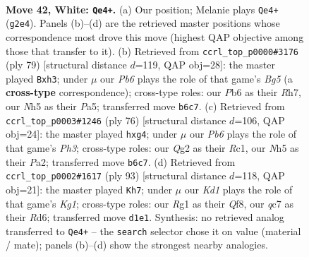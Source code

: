 \documentclass[11pt]{article}
\begin{document}
\clearpage

\begin{figure}[p]\centering
\begin{subfigure}{0.46\textwidth}\centering
\resizebox{\linewidth}{!}{%
\newchessgame
\chessboard[
  setfen={2b1k3/p1qn1r1p/1P3b1B/5P1N/1p1p4/8/p3P1Q1/1N1K2R1 w - - 0 42},
  showmover=false,
  pgfstyle=straightmove, color=movearrow, markmove={g2-e4}
]}
\caption{}
\end{subfigure}\hfill
\begin{subfigure}{0.46\textwidth}\centering
\resizebox{\linewidth}{!}{%
\newchessgame
\chessboard[
  setfen={5rk1/7r/1p6/p1nPp3/2P1P1b1/2R2N1Q/8/1R3BK1 b - - 0 40},
  showmover=false,
  pgfstyle=straightmove, color=movearrow, markmove={g4-h3}
]}
\caption{}
\end{subfigure}
\\[4pt]
\begin{subfigure}{0.46\textwidth}\centering
\resizebox{\linewidth}{!}{%
\newchessgame
\chessboard[
  setfen={7k/r5bp/8/p2N4/1p1n2q1/1P5P/P5N1/2R4K w - - 0 39},
  showmover=false,
  pgfstyle=straightmove, color=movearrow, markmove={h3-g4}
]}
\caption{}
\end{subfigure}\hfill
\begin{subfigure}{0.46\textwidth}\centering
\resizebox{\linewidth}{!}{%
\newchessgame
\chessboard[
  setfen={5qk1/8/p2rb1p1/3NQ1pn/2B1P3/8/1PR5/1K6 b - - 6 47},
  showmover=false,
  pgfstyle=straightmove, color=movearrow, markmove={g8-h7}
]}
\caption{}
\end{subfigure}
\caption{\textbf{Move 42, White: \texttt{Qe4+}.} (a) Our position; Melanie plays \texttt{Qe4+} (\texttt{g2e4}). Panels (b)--(d) are the retrieved master positions whose correspondence most drove this move (highest QAP objective among those that transfer to it). (b) Retrieved from \texttt{ccrl\_top\_p0000\#3176} (ply 79) [structural distance $d$=119, QAP obj=28]: the master played \texttt{Bxh3}; under $\mu$ our \emph{Pb6} plays the role of that game's \emph{Bg5} (a \textbf{cross-type} correspondence); cross-type roles: our \emph{P}b6 as their \emph{R}h7, our \emph{N}h5 as their \emph{P}a5; transferred move \texttt{b6c7}. (c) Retrieved from \texttt{ccrl\_top\_p0003\#1246} (ply 76) [structural distance $d$=106, QAP obj=24]: the master played \texttt{hxg4}; under $\mu$ our \emph{Pb6} plays the role of that game's \emph{Ph3}; cross-type roles: our \emph{Q}g2 as their \emph{R}c1, our \emph{N}h5 as their \emph{P}a2; transferred move \texttt{b6c7}. (d) Retrieved from \texttt{ccrl\_top\_p0002\#1617} (ply 93) [structural distance $d$=118, QAP obj=21]: the master played \texttt{Kh7}; under $\mu$ our \emph{Kd1} plays the role of that game's \emph{Kg1}; cross-type roles: our \emph{R}g1 as their \emph{Q}f8, our \emph{q}c7 as their \emph{R}d6; transferred move \texttt{d1e1}. Synthesis: no retrieved analog transferred to \texttt{Qe4+} -- the \texttt{search} selector chose it on value (material / mate); panels (b)--(d) show the strongest nearby analogies.}
\label{fig:thought-m82}
\end{figure}
\end{document}

